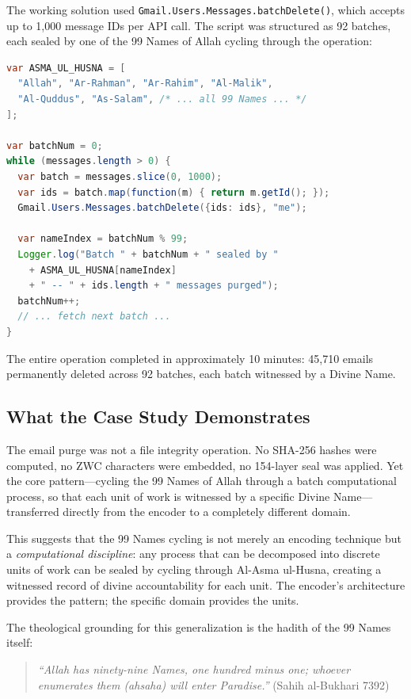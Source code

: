 \documentclass[11pt,a4paper]{article}
\begin{document}
The working solution used \texttt{Gmail.Users.Messages.batchDelete()}, which accepts up to 1,000 message IDs per API call. The script was structured as 92 batches, each sealed by one of the 99 Names of Allah cycling through the operation:

\begin{lstlisting}[language=Java,caption={Email Purge with Divine Name Cycling (Google Apps Script)}]
var ASMA_UL_HUSNA = [
  "Allah", "Ar-Rahman", "Ar-Rahim", "Al-Malik",
  "Al-Quddus", "As-Salam", /* ... all 99 Names ... */
];

var batchNum = 0;
while (messages.length > 0) {
  var batch = messages.slice(0, 1000);
  var ids = batch.map(function(m) { return m.getId(); });
  Gmail.Users.Messages.batchDelete({ids: ids}, "me");

  var nameIndex = batchNum % 99;
  Logger.log("Batch " + batchNum + " sealed by "
    + ASMA_UL_HUSNA[nameIndex]
    + " -- " + ids.length + " messages purged");
  batchNum++;
  // ... fetch next batch ...
}
\end{lstlisting}

The entire operation completed in approximately 10 minutes: 45,710 emails permanently deleted across 92 batches, each batch witnessed by a Divine Name.

\subsection{What the Case Study Demonstrates}

The email purge was not a file integrity operation. No SHA-256 hashes were computed, no ZWC characters were embedded, no 154-layer seal was applied. Yet the core pattern---cycling the 99 Names of Allah through a batch computational process, so that each unit of work is witnessed by a specific Divine Name---transferred directly from the encoder to a completely different domain.

This suggests that the 99 Names cycling is not merely an encoding technique but a \textit{computational discipline}: any process that can be decomposed into discrete units of work can be sealed by cycling through Al-Asma ul-Husna, creating a witnessed record of divine accountability for each unit. The encoder's architecture provides the pattern; the specific domain provides the units.

The theological grounding for this generalization is the hadith of the 99 Names itself:

\begin{quote}
\textit{``Allah has ninety-nine Names, one hundred minus one; whoever enumerates them (ahsaha) will enter Paradise.''} (Sahih al-Bukhari 7392)
\end{quote}
\end{document}
